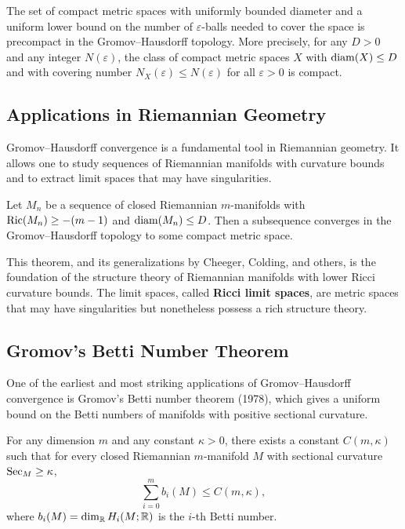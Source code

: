 \begin{theorem}
The set of compact metric spaces with uniformly bounded diameter and a uniform lower bound on the number of \(\varepsilon\)-balls needed to cover the space is precompact in the Gromov--Hausdorff topology. More precisely, for any \(D > 0\) and any integer \(N(\varepsilon)\), the class of compact metric spaces \(X\) with \(\operatorname{diam}(X) \leq D\) and with covering number \(N_X(\varepsilon) \leq N(\varepsilon)\) for all \(\varepsilon > 0\) is compact.
\end{theorem}

\subsection{Applications in Riemannian Geometry}

Gromov--Hausdorff convergence is a fundamental tool in Riemannian geometry. It allows one to study sequences of Riemannian manifolds with curvature bounds and to extract limit spaces that may have singularities.

\begin{theorem}
Let \(M_n\) be a sequence of closed Riemannian \(m\)-manifolds with \(\operatorname{Ric}(M_n) \geq -(m-1)\) and \(\operatorname{diam}(M_n) \leq D\). Then a subsequence converges in the Gromov--Hausdorff topology to some compact metric space.
\end{theorem}

This theorem, and its generalizations by Cheeger, Colding, and others, is the foundation of the structure theory of Riemannian manifolds with lower Ricci curvature bounds. The limit spaces, called \textbf{Ricci limit spaces}, are metric spaces that may have singularities but nonetheless possess a rich structure theory.

\subsection{Gromov's Betti Number Theorem}

One of the earliest and most striking applications of Gromov--Hausdorff convergence is Gromov's Betti number theorem (1978), which gives a uniform bound on the Betti numbers of manifolds with positive sectional curvature.

\begin{theorem}
For any dimension \(m\) and any constant \(\kappa > 0\), there exists a constant \(C(m, \kappa)\) such that for every closed Riemannian \(m\)-manifold \(M\) with sectional curvature \(\operatorname{Sec}_M \geq \kappa\),
\[
\sum_{i=0}^m b_i(M) \leq C(m, \kappa),
\]
where \(b_i(M) = \dim_{\mathbb{R}} H_i(M; \mathbb{R})\) is the \(i\)-th Betti number.
\end{theorem}

